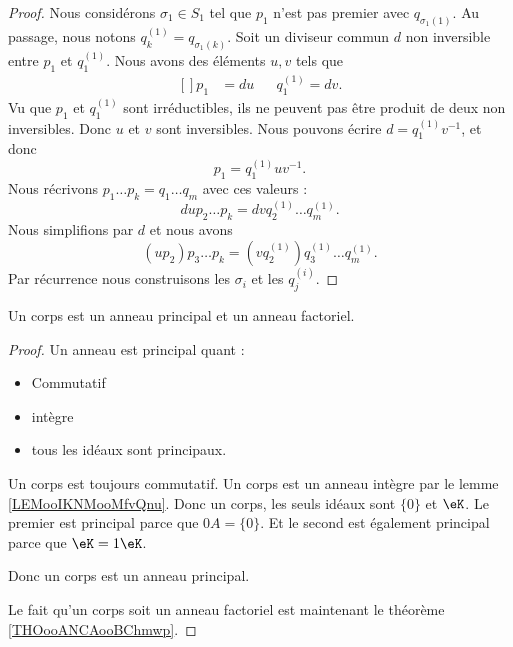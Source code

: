 \begin{proof}
	Nous considérons \( \sigma_1\in S_1\) tel que \( p_1\) n'est pas premier avec \( q_{\sigma_1(1)}\). Au passage, nous notons \( q^{(1)}_k=q_{\sigma_1(k)}\). Soit un diviseur commun \( d\) non inversible entre \( p_1\) et \( q^{(1)}_1\). Nous avons des éléments \( u,v\) tels que
	\begin{equation}
		\begin{aligned}[]
			p_1 & =du &  & q_1^{(1)}=dv.
		\end{aligned}
	\end{equation}
	Vu que \( p_1\) et \( q_1^{(1)}\) sont irréductibles, ils ne peuvent pas être produit de deux non inversibles. Donc \( u\) et \( v\) sont inversibles. Nous pouvons écrire \( d=q_1^{(1)}v^{-1}\), et donc
	\begin{equation}
		p_1=q_1^{(1)}uv^{-1}.
	\end{equation}
	Nous récrivons \( p_1\ldots p_k=q_1\ldots q_m\) avec ces valeurs :
	\begin{equation}
		dup_2\ldots p_k=dvq^{(1)}_2\ldots q_m^{(1)}.
	\end{equation}
	Nous simplifions par \( d\) et nous avons
	\begin{equation}
		(up_2)p_3\ldots p_k=(vq^{(1)}_2)q^{(1)}_3\ldots q_m^{(1)}.
	\end{equation}
	Par récurrence nous construisons les \( \sigma_i\) et les  \( q^{(i)}_j\).
\end{proof}

\begin{proposition}		\label{PROPooPVFOooJvWRIh}
	Un corps est un anneau principal et un anneau factoriel.
\end{proposition}

\begin{proof}
	Un anneau est principal quant :
	\begin{itemize}
		\item
		      Commutatif
		\item
		      intègre
		\item
		      tous les idéaux sont principaux.
	\end{itemize}
	Un corps est toujours commutatif. Un corps est un anneau intègre par le lemme \ref{LEMooIKNMooMfvQnu}. Donc un corps, les seuls idéaux sont \( \{ 0 \} \) et \( \eK\). Le premier est principal parce que \( 0A=\{ 0 \}\). Et le second est également principal parce que \( \eK=1\eK\).

	Donc un corps est un anneau principal.

	Le fait qu'un corps soit un anneau factoriel est maintenant le théorème \ref{THOooANCAooBChmwp}.
\end{proof}

